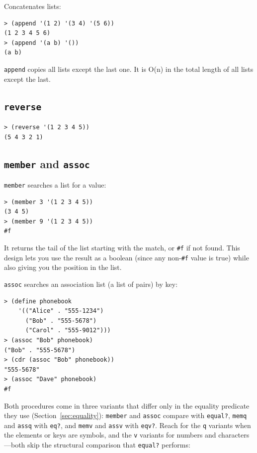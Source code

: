 Concatenates lists:

\begin{lstlisting}[style=repl]
> (append '(1 2) '(3 4) '(5 6))
(1 2 3 4 5 6)
> (append '(a b) '())
(a b)
\end{lstlisting}

\texttt{append} copies all lists except the last one. It is O(n) in the total length of all lists except the last.

\subsection{\texttt{reverse}}

\begin{lstlisting}[style=repl]
> (reverse '(1 2 3 4 5))
(5 4 3 2 1)
\end{lstlisting}

\subsection{\texttt{member} and \texttt{assoc}}

\texttt{member} searches a list for a value:

\begin{lstlisting}[style=repl]
> (member 3 '(1 2 3 4 5))
(3 4 5)
> (member 9 '(1 2 3 4 5))
#f
\end{lstlisting}

It returns the tail of the list starting with the match, or \texttt{\#f} if not found. This design lets you use the result as a boolean (since any non-\texttt{\#f} value is true) while also giving you the position in the list.

\texttt{assoc} searches an association list (a list of pairs) by key:

\begin{lstlisting}[style=repl]
> (define phonebook
    '(("Alice" . "555-1234")
      ("Bob" . "555-5678")
      ("Carol" . "555-9012")))
> (assoc "Bob" phonebook)
("Bob" . "555-5678")
> (cdr (assoc "Bob" phonebook))
"555-5678"
> (assoc "Dave" phonebook)
#f
\end{lstlisting}

Both procedures come in three variants that differ only in the equality predicate they use (Section~\ref{sec:equality}): \texttt{member} and \texttt{assoc} compare with \texttt{equal?}, \texttt{memq} and \texttt{assq} with \texttt{eq?}, and \texttt{memv} and \texttt{assv} with \texttt{eqv?}. Reach for the \texttt{q} variants when the elements or keys are symbols, and the \texttt{v} variants for numbers and characters---both skip the structural comparison that \texttt{equal?} performs:

